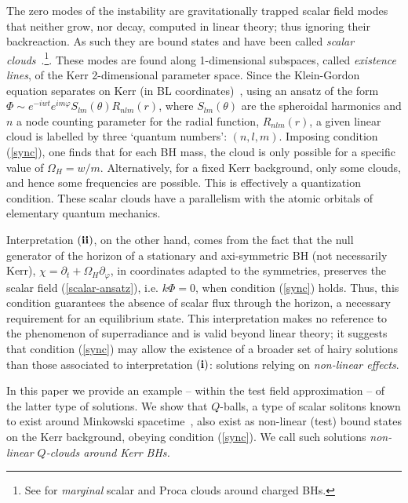 The zero modes of the instability are gravitationally trapped scalar field modes that neither grow, nor decay, computed in linear theory; thus ignoring their backreaction. As such they are bound states and have been called \textit{scalar clouds}~\cite{Hod:2012px,Hod:2013zza,Herdeiro:2014goa,Hod:2014baa,Benone:2014ssa}.\footnote{See \cite{Degollado:2013eqa,Sampaio:2014swa} for \textit{marginal} scalar and Proca clouds around charged BHs.}. These modes are found along 1-dimensional subspaces, called \textit{existence lines}, of the Kerr 2-dimensional parameter space. Since the Klein-Gordon equation separates on Kerr (in BL coordinates)~\cite{Brill:1972xj}, using an ansatz of the form $\Phi\sim e^{-iwt}e^{im\varphi}S_{lm}(\theta)R_{nlm}(r)$, where $S_{lm}(\theta)$ are the spheroidal harmonics and $n$ a node counting parameter for the radial function, $R_{nlm}(r)$, a given linear cloud is labelled by three `quantum numbers': $(n,l,m)$. Imposing condition (\ref{sync}), one finds that for each BH mass, the cloud is only possible for a specific value of $\Omega_H=w/m$. Alternatively, for a fixed Kerr background, only some clouds, and hence some frequencies are possible. This is effectively a quantization condition. These scalar clouds have a parallelism with the atomic orbitals of elementary quantum mechanics.


\bigskip

Interpretation ${\bf (ii)}$, on the other hand, comes from the fact that the null generator of the horizon of a stationary and axi-symmetric BH (not necessarily Kerr), $\chi=\partial_t+\Omega_H\partial_\varphi$, in coordinates adapted to the symmetries, preserves the scalar field (\ref{scalar-ansatz}), i.e. $k\Phi=0$, when condition (\ref{sync}) holds. Thus, this condition guarantees the absence of scalar flux through the horizon, a necessary requirement for an equilibrium state. This interpretation makes no reference to the phenomenon of superradiance and is valid beyond linear theory; it suggests that condition (\ref{sync}) may allow the existence of a broader set of hairy solutions than those associated to interpretation ${\bf (i)}$: solutions relying on  \textit{non-linear effects}.

\bigskip


In this paper we provide an example -- within the test field approximation -- of the latter type of solutions. We show that $Q$-balls, a type of scalar solitons known to exist around Minkowski spacetime~\cite{Coleman:1985ki,Lee:1991ax}, also exist as non-linear (test) bound states on the Kerr background, obeying condition (\ref{sync}). We call such solutions \textit{non-linear $Q$-clouds around Kerr BHs.}

